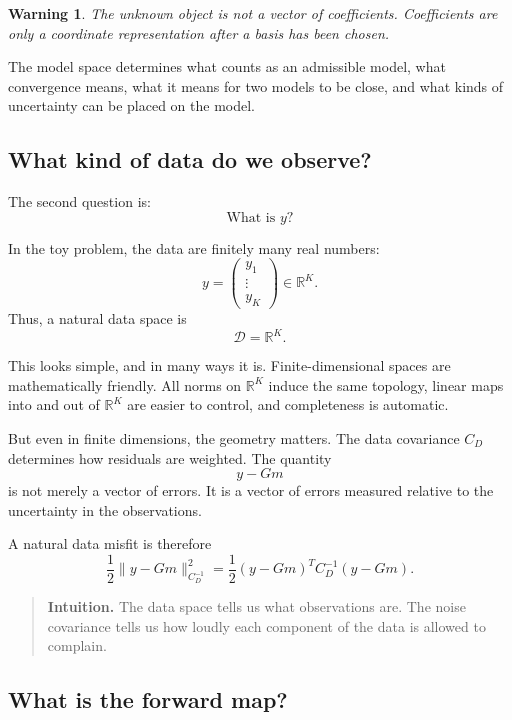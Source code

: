 \documentclass[11pt,a4paper]{book}
\newtheorem{warning}[definition]{Warning}
\newenvironment{intuition}
  {\begin{quote}\textbf{Intuition.}}
  {\end{quote}}
\newcommand{\D}{\mathcal{D}}      %
\newcommand{\obs}{y}
\newcommand{\G}{G}
\begin{document}
\begin{warning}
The unknown object is not a vector of coefficients. Coefficients are only a
coordinate representation after a basis has been chosen.
\end{warning}

The model space determines what counts as an admissible model, what convergence
means, what it means for two models to be close, and what kinds of uncertainty
can be placed on the model.

\subsection{What kind of data do we observe?}

The second question is:
\[
    \text{What is } \obs?
\]

In the toy problem, the data are finitely many real numbers:
\[
    \obs =
    \begin{pmatrix}
        y_1\\
        \vdots\\
        y_K
    \end{pmatrix}
    \in \mathbb{R}^K.
\]
Thus, a natural data space is
\[
    \D = \mathbb{R}^K.
\]

This looks simple, and in many ways it is. Finite-dimensional spaces are
mathematically friendly. All norms on $\mathbb{R}^K$ induce the same topology,
linear maps into and out of $\mathbb{R}^K$ are easier to control, and
completeness is automatic.

But even in finite dimensions, the geometry matters. The data covariance
$C_D$ determines how residuals are weighted. The quantity
\[
    \obs - \G m
\]
is not merely a vector of errors. It is a vector of errors measured relative to
the uncertainty in the observations.

A natural data misfit is therefore
\[
    \frac{1}{2}
    \|\obs-\G m\|_{C_D^{-1}}^2
    =
    \frac{1}{2}
    (\obs-\G m)^T C_D^{-1}(\obs-\G m).
\]

\begin{intuition}
The data space tells us what observations are. The noise covariance tells us
how loudly each component of the data is allowed to complain.
\end{intuition}

\subsection{What is the forward map?}
\end{document}
